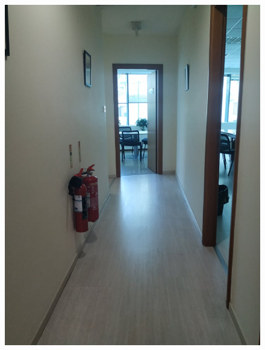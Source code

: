 \documentclass{aifyp}
\begin{document}
\begin{appendices}
\begin{figure}[H]
\begin{minipage}{.5\textwidth}
          \includegraphics[scale=0.2]{Images/Chapter5/DatahandlingCorr2.jpg}
          \label{fig:test2}
        \end{minipage}
    \end{figure}
    \begin{figure}[H]
    \centering
        \begin{minipage}{.5\textwidth}
          \centering

\end{minipage}
\end{figure}
\end{appendices}
\end{document}
